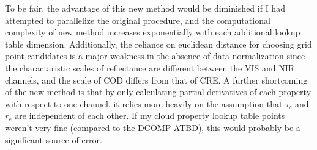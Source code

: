 \documentclass[12pt]{article}
\begin{document}
To be fair, the advantage of this new method would be diminished if I had attempted to parallelize the original procedure, and the computational complexity of new method increases exponentially with each additional lookup table dimension. Additionally, the reliance on euclidean distance for choosing grid point candidates is a major weakness in the absence of data normalization since the charactaristic scales of reflectance are different between the VIS and NIR channels, and the scale of COD differs from that of CRE. A further shortcoming of the new method is that by only calculating partial derivatives of each property with respect to one channel, it relies more heavily on the assumption that $\tau_c$ and $r_e$ are independent of each other. If my cloud property lookup table points weren't very fine (compared to the DCOMP ATBD), this would probably be a significant source of error.
\end{document}

